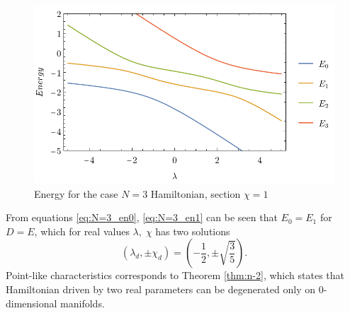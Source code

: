 \begin{figure}[h]
    \centering
    \includegraphics{../img/N=3_energiesc.pdf}
    \caption{Energy for the case $N=3$ Hamiltonian, section $\chi=1$}
    \label{fig:N=3_energiesc}
\end{figure}

From equations \ref{eq:N=3_en0}, \ref{eq:N=3_en1} can be seen that $E_0=E_1$ for $D=E$, which for real values $\lambda,\;\chi$ has two solutions
$$(\lambda_d,\pm \chi_d)=\left(-\frac{1}{2},\pm\sqrt{\frac{3}{5}}\right).$$
Point-like characteristics corresponds to Theorem \ref{thm:n-2}, which states that Hamiltonian driven by two real parameters can be degenerated only on 0-dimensional manifolds. 

